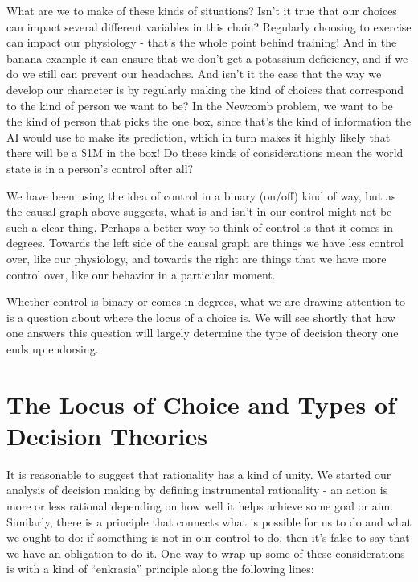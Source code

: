 \documentclass[]{tufte-book}
\begin{document}
What are we to make of these kinds of situations? Isn't it true that our choices can impact several different variables in this chain? Regularly choosing to exercise can impact our physiology - that's the whole point behind training! And in the banana example it can ensure that we don't get a potassium deficiency, and if we do we still can prevent our headaches. And isn't it the case that the way we develop our character is by regularly making the kind of choices that correspond to the kind of person we want to be? In the Newcomb problem, we want to be the kind of person that picks the one box, since that's the kind of information the AI would use to make its prediction, which in turn makes it highly likely that there will be a \$1M in the box! Do these kinds of considerations mean the world state is in a person's control after all?

We have been using the idea of control in a binary (on/off) kind of way, but as the causal graph above suggests, what is and isn't in our control might not be such a clear thing. Perhaps a better way to think of control is that it comes in degrees. Towards the left side of the causal graph are things we have less control over, like our physiology, and towards the right are things that we have more control over, like our behavior in a particular moment.

Whether control is binary or comes in degrees, what we are drawing attention to is a question about where the locus of a choice is. We will see shortly that how one answers this question will largely determine the type of decision theory one ends up endorsing.

\hypertarget{the-locus-of-choice-and-types-of-decision-theories}{%
\section{The Locus of Choice and Types of Decision Theories}\label{the-locus-of-choice-and-types-of-decision-theories}}

It is reasonable to suggest that rationality has a kind of unity. We started our analysis of decision making by defining instrumental rationality - an action is more or less rational depending on how well it helps achieve some goal or aim. Similarly, there is a principle that connects what is possible for us to do and what we ought to do: if something is not in our control to do, then it's false to say that we have an obligation to do it. One way to wrap up some of these considerations is with a kind of ``enkrasia'' principle along the following lines:
\end{document}
